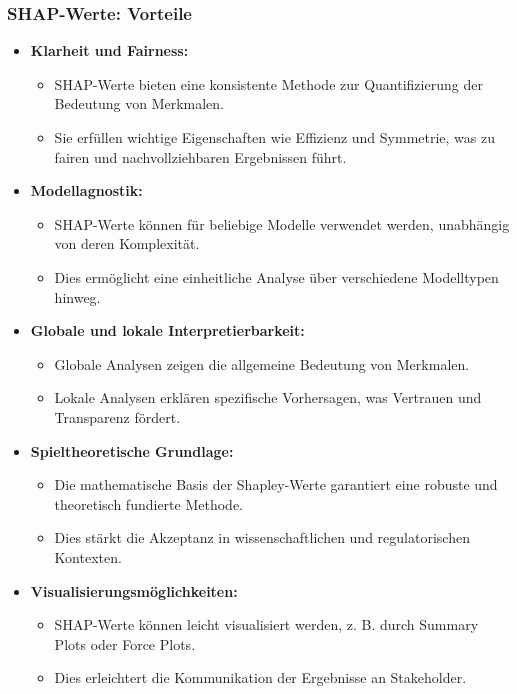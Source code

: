 \documentclass[aspectratio=1610, xcolor=dvipsnames, 9pt]{beamer}
\begin{document}
\begin{frame}
  \frametitle{SHAP-Werte: Vorteile}
  \begin{itemize}
    \item \textbf{Klarheit und Fairness:}
    \begin{itemize}
      \item SHAP-Werte bieten eine konsistente Methode zur Quantifizierung der Bedeutung von Merkmalen.
      \item Sie erfüllen wichtige Eigenschaften wie Effizienz und Symmetrie, was zu fairen und nachvollziehbaren Ergebnissen führt.
    \end{itemize}
    \item \textbf{Modellagnostik:}
    \begin{itemize}
      \item SHAP-Werte können für beliebige Modelle verwendet werden, unabhängig von deren Komplexität.
      \item Dies ermöglicht eine einheitliche Analyse über verschiedene Modelltypen hinweg.
    \end{itemize}
    \item \textbf{Globale und lokale Interpretierbarkeit:}
    \begin{itemize}
      \item Globale Analysen zeigen die allgemeine Bedeutung von Merkmalen.
      \item Lokale Analysen erklären spezifische Vorhersagen, was Vertrauen und Transparenz fördert.
    \end{itemize}
    \item \textbf{Spieltheoretische Grundlage:}
    \begin{itemize}
      \item Die mathematische Basis der Shapley-Werte garantiert eine robuste und theoretisch fundierte Methode.
      \item Dies stärkt die Akzeptanz in wissenschaftlichen und regulatorischen Kontexten.
    \end{itemize}
    \item \textbf{Visualisierungsmöglichkeiten:}
    \begin{itemize}
      \item SHAP-Werte können leicht visualisiert werden, z. B. durch Summary Plots oder Force Plots.
      \item Dies erleichtert die Kommunikation der Ergebnisse an Stakeholder.
    \end{itemize}
  \end{itemize}
\end{frame}
\end{document}
